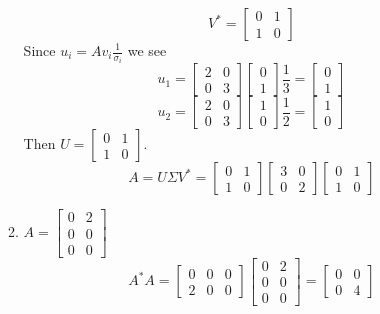 \documentclass[12pt]{article}
\numberwithin{equation}{section}
\begin{document}
\begin{enumerate}
\begin{enumerate}
    $$V^*=\left[\begin{array}{cc}0&1\\1&0\end{array}\right]$$
    Since $u_i=Av_i\frac{1}{\sigma_i}$ we see
    $$u_1=\left[\begin{array}{cc}2&0\\0&3\end{array}\right]\left[\begin{array}{c}0\\1\end{array}\right]\frac{1}{3}=\left[\begin{array}{c}0\\1\end{array}\right]$$
    $$u_2=\left[\begin{array}{cc}2&0\\0&3\end{array}\right]\left[\begin{array}{c}1\\0\end{array}\right]\frac{1}{2}=\left[\begin{array}{c}1\\0\end{array}\right]$$
    Then $U=\left[\begin{array}{cc}0&1\\1&0\end{array}\right]$.
    $$A=U\Sigma V^*=\left[\begin{array}{cc}0&1\\1&0\end{array}\right]\left[\begin{array}{cc}3&0\\0&2\end{array}\right]\left[\begin{array}{cc}0&1\\1&0\end{array}\right]$$
    \item $A=\left[\begin{array}{cc}0&2\\0&0\\0&0\end{array}\right]$
    $$A^*A=\left[\begin{array}{ccc}0&0&0\\2&0&0\end{array}\right]\left[\begin{array}{cc}0&2\\0&0\\0&0\end{array}\right]=\left[\begin{array}{cc}0&0\\0&4\end{array}\right]$$

\end{enumerate}
\end{enumerate}
\end{document}
